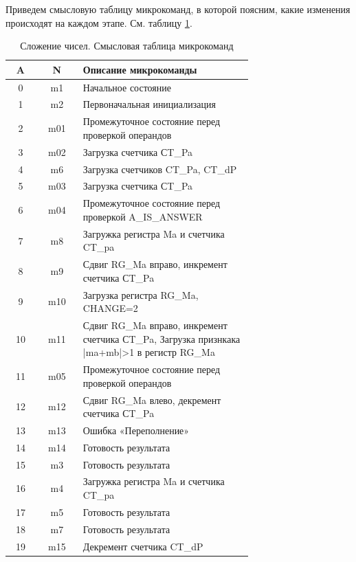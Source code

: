 \documentclass[a4paper,14pt]{extarticle}
\begin{document}
Приведем смысловую таблицу микрокоманд, в которой поясним, какие изменения происходят на каждом этапе. См. таблицу \ref{tab:coursesummeaning}.
\begin{table}[htbp]
	\small
	\centering
	\begin{tabular}{|c||c|m{0.7\linewidth}|}
		\hline
		\textbf{A} & \textbf{N} & \textbf{Описание микрокоманды} \\ \hline \hline
		0 & m1 & Начальное состояние \\ \hline
		1 & m2 & Первоначальная инициализация \\ \hline
		2 & m01 & Промежуточное состояние перед проверкой операндов \\ \hline
		3 & m02 & Загрузка счетчика СT\_Pa \\ \hline
		4 & m6 & Загрузка счетчиков CT\_Pa, CT\_dP \\ \hline
		5 & m03 & Загрузка счетчика СT\_Pa \\ \hline
		6 & m04 & Промежуточное состояние перед проверкой A\_IS\_ANSWER \\ \hline
		7 & m8 & Загружка регистра Ma и счетчика CT\_pa \\ \hline
		8 & m9 & Сдвиг RG\_Ma вправо, инкремент счетчика СT\_Pa \\ \hline
		9 & m10 & Загрузка регистра RG\_Ma, CHANGE=2 \\ \hline
		10 & m11 & Сдвиг RG\_Ma вправо, инкремент счетчика СT\_Pa, Загрузка признкака |ma+mb|>1 в регистр RG\_Ma \\ \hline
		11 & m05 & Промежуточное состояние перед проверкой операндов \\ \hline
		12 & m12 & Сдвиг RG\_Ma влево, декремент счетчика СT\_Pa \\ \hline
		13 & m13 & Ошибка «Переполнение» \\ \hline
		14 & m14 & Готовость результата \\ \hline
		15 & m3 & Готовость результата \\ \hline
		16 & m4 & Загружка регистра Ma и счетчика CT\_pa \\ \hline
		17 & m5 & Готовость результата \\ \hline
		18 & m7 & Готовость результата \\ \hline
		19 & m15 & Декремент счетчика CT\_dP \\ \hline
	\end{tabular}
	\caption{Сложение чисел. Смысловая таблица микрокоманд}
	\label{tab:coursesummeaning}
\end{table}
\end{document}
